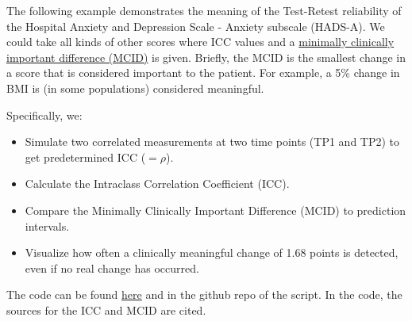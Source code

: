 \documentclass[
]{book}
\providecommand{\tightlist}{%
  \setlength{\itemsep}{0pt}\setlength{\parskip}{0pt}}
\begin{document}
The following example demonstrates the meaning of the Test-Retest reliability of
the Hospital Anxiety and Depression Scale - Anxiety subscale (HADS-A). We could take
all kinds of other scores where ICC values and a
\href{https://en.wikipedia.org/wiki/Minimal_important_difference}{minimally clinically important difference (MCID)}
is given. Briefly, the MCID is the smallest change in a score that is considered
important to the patient. For example, a 5\% change in BMI is (in some populations)
considered meaningful.

Specifically, we:

\begin{itemize}
\tightlist
\item
  Simulate two correlated measurements at two time points (TP1 and TP2)
  to get predetermined ICC (\(=\rho\)).
\item
  Calculate the Intraclass Correlation Coefficient (ICC).
\item
  Compare the Minimally Clinically Important Difference (MCID) to prediction intervals.
\item
  Visualize how often a clinically meaningful change of 1.68 points is
  detected, even if no real change has occurred.
\end{itemize}

The code can be found \href{https://github.com/jdegenfellner/ICC_MCID/blob/main/ICC_MCID.R}{here}
and in the github repo of the script. In the code, the sources for the ICC and MCID are
cited.
\end{document}

